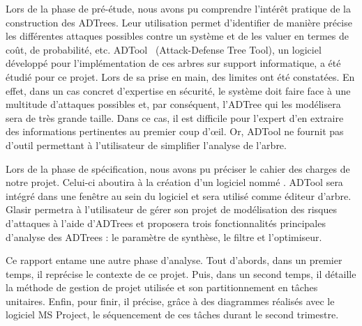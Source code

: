 Lors de la phase de pré-étude, nous avons pu comprendre l’intérêt pratique de la construction des ADTrees. Leur utilisation permet d'identifier de manière précise les différentes attaques possibles contre un système et de les valuer en termes de coût, de probabilité, etc. ADTool~\cite{adtool_paper} (Attack-Defense Tree Tool), un logiciel développé pour l'implémentation de ces arbres sur support informatique, a été étudié pour ce projet. Lors de sa prise en main, des limites ont été constatées. En effet, dans un cas concret d'expertise en sécurité, le système doit faire face à une multitude d'attaques possibles et, par conséquent, l'ADTree qui les modélisera sera de très grande taille. Dans ce cas, il est difficile pour l'expert d'en extraire des informations pertinentes au premier coup d’œil. Or, ADTool ne fournit pas d'outil permettant à l'utilisateur de simplifier l'analyse de l'arbre. 

Lors de la phase de spécification, nous avons pu préciser le cahier des charges de notre projet. Celui-ci aboutira à la création d'un logiciel nommé \glasir{}. ADTool sera intégré dans une fenêtre au sein du logiciel et sera utilisé comme éditeur d'arbre. Glasir permetra à l'utilisateur de gérer son projet de modélisation des risques d'attaques à l'aide d'ADTrees et proposera trois fonctionnalités principales d'analyse des ADTrees : le paramètre de synthèse, le filtre et l'optimiseur.

Ce rapport entame une autre phase d'analyse. Tout d’abords, dans un premier temps, il reprécise le contexte de ce projet. Puis, dans un second temps, il détaille la méthode de gestion de projet utilisée et son partitionnement en tâches unitaires. Enfin, pour finir, il précise, grâce à des diagrammes réalisés avec le logiciel MS Project, le séquencement de ces tâches durant le second trimestre.